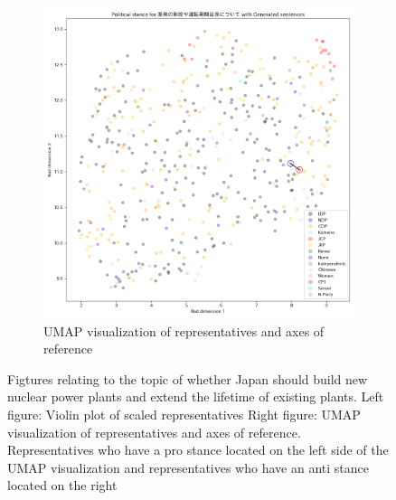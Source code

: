 \documentclass[final,5p,times,twocolumn,authoryear]{elsarticle}
\begin{document}
\begin{figure}[h]
\begin{subfigure}{0.22\textwidth}
      \includegraphics[width=1\linewidth]{figs/results/nuclear/原発の新設や運転期間延長について_umap_gen.png}
      \caption{UMAP visualization of representatives and axes of reference}
    \end{subfigure}
\caption{Figtures relating to the topic of whether Japan should build new nuclear power plants and extend the lifetime of existing plants. Left figure: Violin plot of scaled representatives Right figure: UMAP visualization of representatives and axes of reference. Representatives who have a pro stance located on the left side of the UMAP visualization and representatives who have an anti stance located on the right}
\label{fig: results-nuclear-new}
\end{figure}
\end{document}
